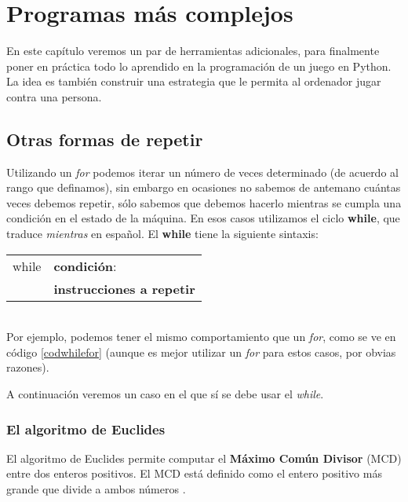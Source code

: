 \chapter{Programas más complejos}

En este capítulo veremos un par de herramientas adicionales, para finalmente poner en práctica todo lo aprendido en la programación de un juego en Python. La idea es también construir una estrategia que le permita al ordenador jugar contra una persona.

\section{Otras formas de repetir}


Utilizando un \emph{for} podemos iterar un número de veces determinado (de acuerdo al rango que definamos), sin embargo en ocasiones no sabemos de antemano cuántas veces debemos repetir, sólo sabemos que debemos hacerlo mientras se cumpla una condición en el estado de la máquina. En esos casos utilizamos el ciclo \textbf{while}, que traduce \emph{mientras} en español. El \textbf{while} tiene la siguiente sintaxis:

\begin{tabular}{l l}
	while & \textbf{condición}: \\
	& \textbf{instrucciones a repetir} \\
\end{tabular} \\

Por ejemplo, podemos tener el mismo comportamiento que un \emph{for}, como se ve en código \ref{codwhilefor} (aunque es mejor utilizar un \emph{for} para estos casos, por obvias razones). 

\newpage



A continuación veremos un caso en el que sí se debe usar el \emph{while}.

\subsection{El algoritmo de Euclides}

El algoritmo de Euclides permite computar el \textbf{Máximo Común Divisor} (MCD) entre dos enteros positivos. El MCD está definido como el entero positivo más grande que divide a ambos números \cite{discretemath}. \\

